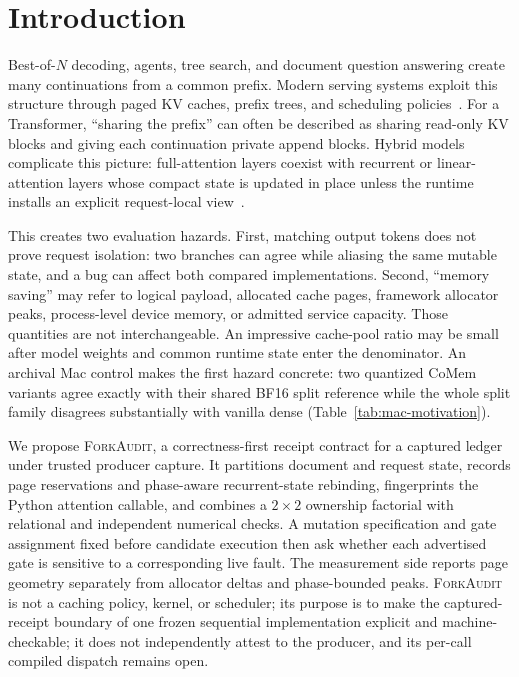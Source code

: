 \documentclass{article}
\newcommand{\method}{\textsc{ForkAudit}}
\begin{document}
\section{Introduction}
\label{sec:intro}

Best-of-$N$ decoding, agents, tree search, and document question answering
create many continuations from a common prefix.  Modern serving systems exploit
this structure through paged KV caches, prefix trees, and scheduling
policies~\citep{kwon2023pagedattention,zheng2024sglang,gim2024promptcache,srivatsa2025preble}.
For a Transformer, ``sharing the prefix'' can often be described as sharing
read-only KV blocks and giving each continuation private append blocks.  Hybrid
models complicate this picture: full-attention layers coexist with recurrent or
linear-attention layers whose compact state is updated in place unless the
runtime installs an explicit request-local view~\citep{yang2025gateddeltanet,lieber2025jamba,pan2025marconi}.

This creates two evaluation hazards.  First, matching output tokens does not
prove request isolation: two branches can agree while aliasing the same mutable
state, and a bug can affect both compared implementations.  Second, ``memory
saving'' may refer to logical payload, allocated cache pages, framework
allocator peaks, process-level device memory, or admitted service capacity.
Those quantities are not interchangeable.  An impressive cache-pool ratio may
be small after model weights and common runtime state enter the denominator.
An archival Mac control makes the first hazard concrete: two quantized CoMem
variants agree exactly with their shared BF16 split reference while the whole
split family disagrees substantially with vanilla dense (Table~\ref{tab:mac-motivation}).

We propose \method, a correctness-first receipt contract for a captured
ledger under trusted producer capture.  It partitions document and request state,
records page reservations and phase-aware recurrent-state rebinding,
fingerprints the Python attention callable, and combines a $2\times2$
ownership factorial with relational and independent numerical checks.  A
mutation specification and gate assignment fixed before candidate execution
then ask whether each advertised gate is sensitive to a corresponding live
fault.  The measurement side reports page
geometry separately from allocator deltas and phase-bounded peaks.  \method{}
is not a caching policy, kernel, or scheduler; its purpose is to make the
captured-receipt boundary of one frozen sequential implementation explicit and
machine-checkable; it does not independently attest to the producer, and its
per-call compiled dispatch remains open.
\end{document}
